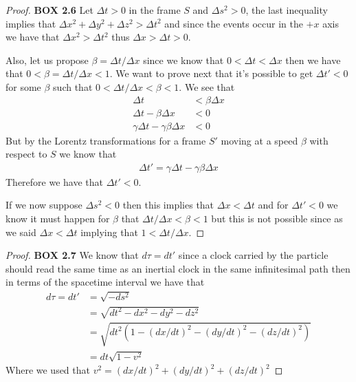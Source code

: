 \documentclass[11pt]{article}
\theoremstyle{definition}
\begin{document}
\begin{proof}{\textbf{BOX 2.6}}
    Let $\Delta t > 0$ in the frame $S$ and $\Delta s^2 > 0$,
    the last inequality implies that
    $\Delta x^2 + \Delta y^2 + \Delta z^2 > \Delta t^2$ and since
    the events occur in the $+x$ axis we have that $\Delta x^2 > \Delta t^2$
    thus $\Delta x > \Delta t > 0$.
    
    Also, let us propose $\beta = \Delta t / \Delta x$ since we know that
    $0 < \Delta t < \Delta x$ then we have that 
    $0 < \beta = \Delta t/\Delta x < 1$.
    We want to prove next that it's possible to get $\Delta t' < 0$ for some
    $\beta$ such that $0 < \Delta t/ \Delta x < \beta < 1$. We see that
    \begin{align*}
        \Delta t &< \beta \Delta x\\
        \Delta t - \beta \Delta x &< 0\\
        \gamma\Delta t - \gamma\beta \Delta x &< 0
    \end{align*}
    But by the Lorentz transformations for a frame $S'$ moving at a speed
    $\beta$ with respect to $S$ we know that
    \begin{align*}
        \Delta t' = \gamma \Delta t - \gamma \beta \Delta x
    \end{align*}
    Therefore we have that $\Delta t' < 0$.

    If we now suppose $\Delta s^2 < 0$ then this implies that
    $\Delta x < \Delta t$ and for $\Delta t' < 0$ we know it must happen for
    $\beta$ that $\Delta t /\Delta x < \beta < 1$ but this is not possible
    since as we said $\Delta x < \Delta t$ implying that
    $1 < \Delta t/ \Delta x $. 
\end{proof}
\begin{proof}{\textbf{BOX 2.7}}
    We know that $d\tau = dt'$ since a clock carried by the particle should
    read the same time as an inertial clock in the same infinitesimal path
    then in terms of the spacetime interval we have that
    \begin{align*}
        d\tau = dt' &= \sqrt{-ds^2}\\
            &= \sqrt{dt^2 - dx^2 - dy^2 - dz^2}\\
            &= \sqrt{dt^2(1 - (dx/dt)^2 - (dy/dt)^2 - (dz/dt)^2)}\\
            &= dt\sqrt{1 - v^2}
    \end{align*}
    Where we used that $v^2 = (dx/dt)^2 + (dy/dt)^2 + (dz/dt)^2$
\end{proof}
\cleardoublepage
\end{document}
